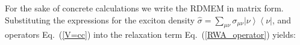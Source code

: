 \documentclass[12pt,twoside,a4paper]{report}
\begin{document}
 For the sake of
concrete calculations we write the RDMEM in matrix form. 
Substituting the expressions for the exciton density 
$\hat{\sigma}
            =  \sum \limits_{\mu \nu}
                     \sigma_{\mu \nu}
                        \left|       \nu  \right\rangle 
                        \left\langle \nu  \right|       $,
and operators Eq.~(\ref{V=cc}) 
into the
relaxation term Eq.~(\ref{RWA_operator}) yields: 
\end{document}
